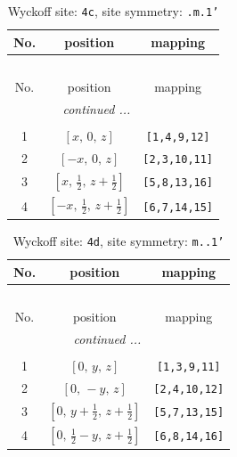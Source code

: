 \documentclass[fleqn,8pt]{jsarticle}
\begin{document}
\renewcommand{\arraystretch}{1.2}
\begin{longtable}{ccc}
\caption{Wyckoff site: {\tt 4c}, site symmetry: {\tt .m.1'}}
 \\
 \hline \hline
No. & position & mapping \\ \hline \endfirsthead

\multicolumn{2}{l}{\tablename\ \thetable{}} \\
 \hline \hline
No. & position & mapping \\ \hline \endhead

 \hline \hline
\multicolumn{2}{r}{\footnotesize\it continued ...} \\ \endfoot

 \hline \hline
\multicolumn{2}{r}{} \\ \endlastfoot

1 & $\left[ x,\, 0,\, z \right]$ & {\tt [1,4,9,12]} \\ \hline
2 & $\left[ - x,\, 0,\, z \right]$ & {\tt [2,3,10,11]} \\ \hline
3 & $\left[ x,\, \frac{1}{2},\, z + \frac{1}{2} \right]$ & {\tt [5,8,13,16]} \\ \hline
4 & $\left[ - x,\, \frac{1}{2},\, z + \frac{1}{2} \right]$ & {\tt [6,7,14,15]} \\
\end{longtable}
\renewcommand{\arraystretch}{1.2}
\begin{longtable}{ccc}
\caption{Wyckoff site: {\tt 4d}, site symmetry: {\tt m..1'}}
 \\
 \hline \hline
No. & position & mapping \\ \hline \endfirsthead

\multicolumn{2}{l}{\tablename\ \thetable{}} \\
 \hline \hline
No. & position & mapping \\ \hline \endhead

 \hline \hline
\multicolumn{2}{r}{\footnotesize\it continued ...} \\ \endfoot

 \hline \hline
\multicolumn{2}{r}{} \\ \endlastfoot

1 & $\left[ 0,\, y,\, z \right]$ & {\tt [1,3,9,11]} \\ \hline
2 & $\left[ 0,\, - y,\, z \right]$ & {\tt [2,4,10,12]} \\ \hline
3 & $\left[ 0,\, y + \frac{1}{2},\, z + \frac{1}{2} \right]$ & {\tt [5,7,13,15]} \\ \hline
4 & $\left[ 0,\, \frac{1}{2} - y,\, z + \frac{1}{2} \right]$ & {\tt [6,8,14,16]} \\
\end{longtable}
\end{document}
